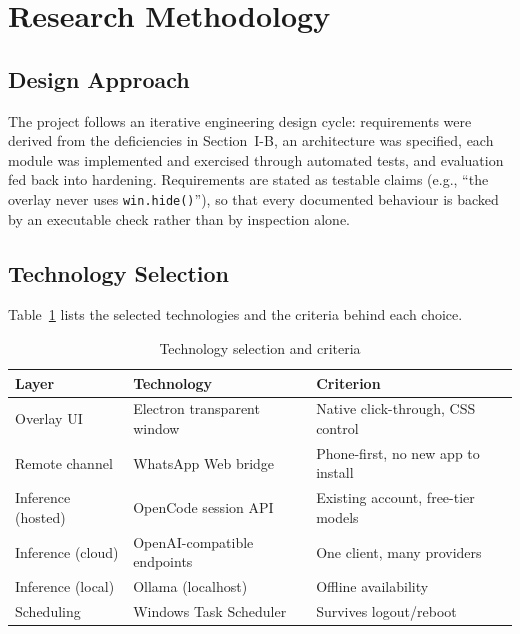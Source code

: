 
\section{Research Methodology}

\subsection{Design Approach}

The project follows an iterative engineering design cycle:
requirements were derived from the deficiencies in
Section~I-B, an architecture was specified, each module was
implemented and exercised through automated tests, and evaluation
fed back into hardening. Requirements are stated as testable
claims (e.g., ``the overlay never uses \texttt{win.hide()}''),
so that every documented behaviour is backed by an executable
check rather than by inspection alone.

\subsection{Technology Selection}

Table~\ref{tab:stack} lists the selected technologies and the
criteria behind each choice.

\begin{table}[t]
\centering\small
\caption{Technology selection and criteria}\label{tab:stack}
\begin{tabular}{@{}p{}p{}p{}@{}}
\toprule
\textbf{Layer} & \textbf{Technology} & \textbf{Criterion} \\
\midrule
Overlay UI & Electron transparent window &
Native click-through, CSS control \\
Remote channel & WhatsApp Web bridge &
Phone-first, no new app to install \\
Inference (hosted) & OpenCode session API &
Existing account, free-tier models \\
Inference (cloud) & OpenAI-compatible endpoints &
One client, many providers \\
Inference (local) & Ollama (localhost) &
Offline availability \\
Scheduling & Windows Task Scheduler &
Survives logout/reboot \\
\bottomrule
\end{tabular}
\end{table}

